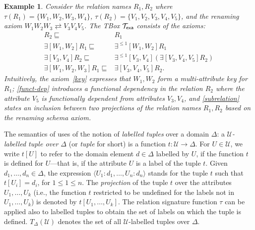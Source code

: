 \documentclass[draft]{article}
\newcommand{\Texa}{\ensuremath{\Tmc_{\sf exa}}\xspace}
\newtheorem{example}{Example}
\begin{document}
\begin{example}
\label{exa:basic}
Consider the relation names $R_1, R_2$ where
%
 $\tau(R_1)  = \{W_1,W_2,W_3,W_4\}$,
 $\tau(R_2)  = \{V_1,V_2,V_3,V_4,V_5\}$,
%
and the renaming axiom 
$W_1W_2W_3 \rightleftarrows V_3V_4V_5$.
The TBox \Texa consists of the axioms:
%
 \begin{align}
   R_2 \sqsubseteq {} & R_1 \label{isaR}\\
   \exists[W_1,W_2] R_1 \sqsubseteq {} & \exists^{\leq 1}[W_1,W_2] R_1 \label{key} \\
     \exists[V_3,V_4] R_2 \sqsubseteq {} & \exists^{\leq 1}[V_3,V_4](\exists[V_3,V_4,V_5] R_2) \label{funct-dep} \\
 \exists[W_1,W_2,W_3] R_1 \sqsubseteq {} & \exists[V_3,V_4,V_5] R_2 \label{subrelation}.
 \end{align}
%
 Intuitively, the axiom~\eqref{key}
 expresses that $W_1,W_2$ form a multi-attribute key for $R_1$;
 \eqref{funct-dep} introduces a functional dependency in the relation
 $R_2$ where the attribute $V_5$ is functionally dependent from
 attributes $V_3, V_4$, and \eqref{subrelation} states an inclusion
 between two projections of the relation names $R_1, R_2$ based on
 the renaming schema axiom.
\end{example}



The semantics of \DLRp uses of the notion of \emph{labelled tuples} over a domain $\Delta$: a 
\emph{$\mathcal{U}$-labelled tuple over $\Delta$} (or \emph{tuple} for short) is a function 
$t \colon \mathcal{U} \to \Delta$. For $U\in \mathcal{U}$, we write $t[U]$ to refer to the domain element ${d\in \Delta}$ 
labelled by $U$, if the function $t$ is defined for $U$---that is, if the attribute $U$ is a label of the tuple $t$. 
Given $d_1,\dots,d_n\in \Delta$, the expression ${\langle U_1\colon d_1,\ldots,U_n\colon d_n\rangle}$ stands for the 
tuple $t$ such that ${t[U_i]=d_i}$, for ${1\leq 1\leq n}$. 
The \emph{projection} of the tuple $t$ over the attributes ${U_1,\ldots,U_k}$ (i.e., the function $t$ 
restricted to be undefined for the labels not in ${U_1,\ldots,U_k}$)
is denoted by ${t[U_1,\ldots,U_k]}$. 
The relation signature function $\tau$ can be applied also to labelled
tuples to obtain the set of labels on which the tuple is defined.
$T_\Delta(\mathcal{U})$ denotes the set of all $\mathcal{U}$\mbox{-}labelled tuples over $\Delta$.
\end{document}
